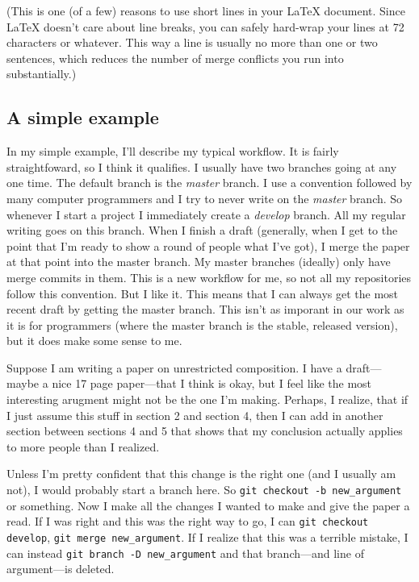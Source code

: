\documentclass{article}
\begin{document}
(This is one (of a few) reasons to use short lines in your LaTeX
document. Since LaTeX doesn't care about line breaks, you can
safely hard-wrap your lines at 72 characters or whatever. This way
a line is usually no more than one or two sentences, which reduces
the number of merge conflicts you run into substantially.)

\subsection{A simple example}

In my simple example, I'll describe my typical workflow. It is
fairly straightfoward, so I think it qualifies. I usually have two
branches going at any one time. The default branch is the
\emph{master} branch. I use a convention followed by many computer
programmers and I try to never write on the \emph{master} branch.
So whenever I start a project I immediately create a \emph{develop}
branch. All my regular writing goes on this branch. When I finish a
draft (generally, when I get to the point that I'm ready to show a
round of people what I've got), I merge the paper at that point
into the master branch. My master branches (ideally) only have
merge commits in them. This is a new workflow for me, so not all my
repositories follow this convention. But I like it. This means that
I can always get the most recent draft by getting the master
branch. This isn't as imporant in our work as it is for programmers
(where the master branch is the stable, released version), but it
does make some sense to me.

Suppose I am writing a paper on unrestricted composition. I have a
draft—maybe a nice 17 page paper—that I think is okay, but I feel
like the most interesting arugment might not be the one I'm making.
Perhaps, I realize, that if I just assume this stuff in section 2
and section 4, then I can add in another section between sections 4
and 5 that shows that my conclusion actually applies to more people
than I realized.

Unless I'm pretty confident that this change is the right one (and
I usually am not), I would probably start a branch here. So
\verb!git checkout -b new_argument! or something. Now I make all
the changes I wanted to make and give the paper a read. If I was
right and this was the right way to go, I can
\verb!git checkout develop!, \verb!git merge new_argument!. If I
realize that this was a terrible mistake, I can instead
\verb!git branch -D new_argument! and that branch—and line of
argument—is deleted.
\end{document}

